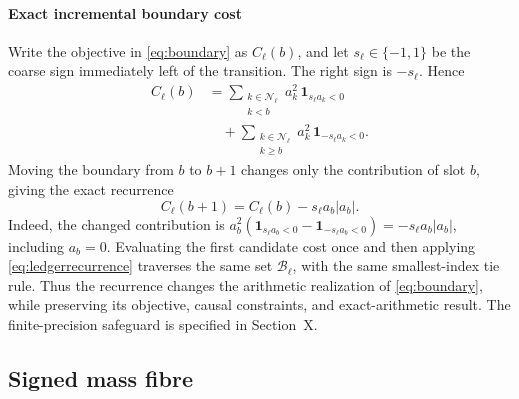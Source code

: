 \documentclass[journal]{IEEEtran}
\begin{document}
\paragraph{Exact incremental boundary cost}
Write the objective in \eqref{eq:boundary} as \(C_\ell(b)\), and let
\(s_\ell\in\{-1,1\}\) be the coarse sign immediately left of the
transition. The right sign is \(-s_\ell\). Hence
\begin{align}
 C_\ell(b)
 &=\sum_{\substack{k\in\mathcal N_\ell\\k<b}}
 a_k^2\,\mathbf1_{s_\ell a_k<0}\nonumber\\
 &\quad+\sum_{\substack{k\in\mathcal N_\ell\\k\ge b}}
 a_k^2\,\mathbf1_{-s_\ell a_k<0}.
 \label{eq:ledgercostexplicit}
\end{align}
Moving the boundary from \(b\) to \(b+1\) changes only the contribution
of slot \(b\), giving the exact recurrence
\begin{equation}
 \boxed{C_\ell(b+1)=C_\ell(b)-s_\ell a_b|a_b|.}
 \label{eq:ledgerrecurrence}
\end{equation}
Indeed, the changed contribution is
\(a_b^2(\mathbf1_{s_\ell a_b<0}-\mathbf1_{-s_\ell a_b<0})
=-s_\ell a_b|a_b|\), including \(a_b=0\). Evaluating the first
candidate cost once and then applying \eqref{eq:ledgerrecurrence} traverses
the same set \(\mathcal B_\ell\), with the same smallest-index tie rule.
Thus the recurrence changes the arithmetic realization of
\eqref{eq:boundary}, while preserving its objective, causal constraints,
and exact-arithmetic result. The finite-precision safeguard is specified
in Section~X.

\subsection{Signed mass fibre}
\end{document}
